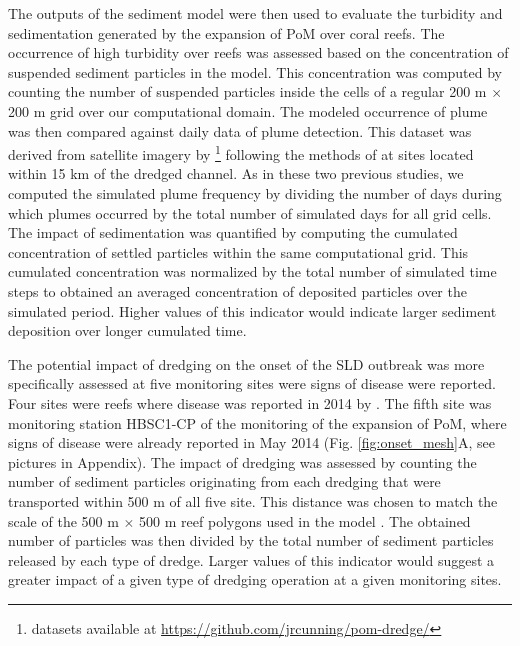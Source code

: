 \documentclass[preprint,12pt,authoryear]{elsarticle}
\begin{document}
The outputs of the sediment model were then used to evaluate the turbidity and sedimentation generated by the expansion of PoM over coral reefs. The occurrence of high turbidity over reefs was assessed based on the concentration of suspended sediment particles in the model. This concentration was computed by counting the number of suspended particles inside the cells of a regular 200 m $\times$ 200 m grid over our computational domain. The modeled occurrence of plume was then compared against daily data of plume detection. This dataset was derived from satellite imagery by \cite{cunning2019extensive}\footnote{datasets available at \url{https://github.com/jrcunning/pom-dredge/}} following the methods of \cite{barnes2015sediment} at sites located within 15 km of the dredged channel. As in these two previous studies, we computed  the simulated plume frequency by dividing the number of days during which plumes occurred by the total number of simulated days for all grid cells. The impact of sedimentation was quantified by computing the cumulated concentration of settled particles within the same computational grid. This cumulated concentration was normalized by the total number of simulated time steps to obtained an averaged concentration of deposited particles over the simulated period. Higher values of this indicator would indicate larger sediment deposition over longer cumulated time.

The potential impact of dredging on the onset of the SLD outbreak was more specifically assessed at five monitoring sites were signs of disease were reported. Four sites were reefs where disease was reported in 2014 by \cite{precht2016unprecedented}. The fifth site was monitoring station HBSC1-CP of the monitoring of the expansion of PoM, where signs of disease were already reported in May 2014 (Fig. \ref{fig:onset_mesh}A, see pictures in Appendix). The impact of dredging was assessed by counting the number of sediment particles originating from each dredging that were transported within 500 m of all five site. This distance was chosen to match the scale of the 500 m $\times$ 500 m reef polygons used in the model \citep{dobbelaere2020coupled}. The obtained number of particles was then divided by the total number of sediment particles released by each type of dredge. Larger values of this indicator would suggest a greater impact of a given type of dredging operation at a given monitoring sites.  
\end{document}
